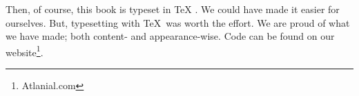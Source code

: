 Then, of course, this book is typeset in \TeX{} . We could have made it easier for ourselves. But, typesetting with \TeX{}\ was worth the effort. We are proud of what we have made; both content- and appearance-wise. Code can be found on our website\footnote{Atlanial.com}.    


\vfill
